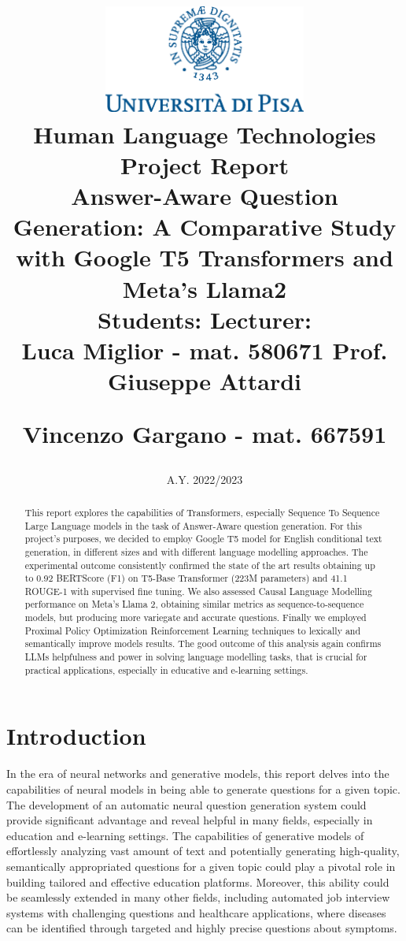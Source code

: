 \documentclass{article}
\title{
    \thispagestyle{empty}
    \includegraphics[width=0.5\textwidth]{assets/marchio_unipi_pant541.eps}\\[1cm]
    {\Large Human Language Technologies Project Report}\\[1cm]
    {\Large \textbf{Answer-Aware Question Generation: A Comparative Study with Google T5 Transformers and Meta's Llama2}}\\[2cm]
    \large
    \noindent \textbf{Students:} \hfill \textbf{Lecturer:}\\[1ex]
    \noindent Luca Miglior - mat. 580671 \hfill Prof. Giuseppe Attardi\\
    \noindent \raggedright{Vincenzo Gargano - mat. 667591} \\[4cm]
    \midrule
    \noindent
    \date{A.Y. 2022/2023}
}
\date{}
\author{}
\begin{document}
\clearpage
\maketitle
\thispagestyle{empty}
\null\vspace{\fill}
\begin{abstract}
\noindent
This report explores the capabilities of Transformers, especially Sequence To Sequence Large Language models in the task of Answer-Aware question generation. For this project's purposes, we decided to employ Google T5 model for English conditional text generation, in different sizes and with different language modelling approaches. The experimental outcome consistently confirmed the state of the art results obtaining up to 0.92 BERTScore (F1) on T5-Base Transformer (223M parameters) and 41.1 ROUGE-1 with supervised fine tuning. We also assessed Causal Language Modelling performance on Meta's Llama 2, obtaining similar metrics as sequence-to-sequence models, but producing more variegate and accurate questions. Finally we employed Proximal Policy Optimization Reinforcement Learning techniques to lexically and semantically improve models results. The good outcome of this analysis again confirms LLMs helpfulness and power in solving language modelling tasks, that is crucial for practical applications, especially in educative and e-learning settings.
\end{abstract}
\vspace{\fill}

\clearpage
\newpage
\tableofcontents
\newpage
\section{Introduction}
In the era of neural networks and generative models, this report delves into the capabilities of neural models in being able to generate questions for a given topic. The development of an automatic neural question generation system could provide significant advantage and reveal helpful in many fields, especially in education and e-learning settings. The capabilities of generative models of effortlessly analyzing vast amount of text and potentially generating high-quality, semantically appropriated questions for a given topic could play a pivotal role in building tailored and effective education platforms. Moreover, this ability could be seamlessly extended in many other fields, including automated job interview systems with challenging questions and healthcare applications, where diseases can be identified through targeted and highly precise questions about symptoms.
\end{document}

